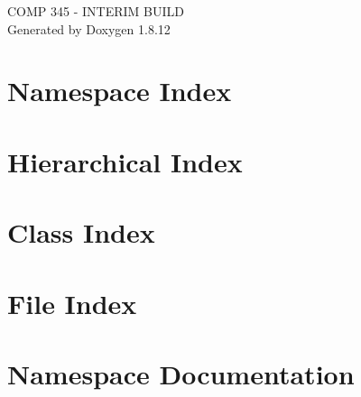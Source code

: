 \documentclass[twoside]{book}
\newcommand{\+}{\discretionary{\mbox{\scriptsize$\hookleftarrow$}}{}{}}
\newcommand{\clearemptydoublepage}{%
  \newpage{\pagestyle{empty}\cleardoublepage}%
}
\begin{document}
\hypersetup{pageanchor=false,
             bookmarksnumbered=true,
             pdfencoding=unicode
            }
\begin{titlepage}
\vspace*{7cm}
\begin{center}%
{\Large C\+O\+MP 345 -\/ I\+N\+T\+E\+R\+IM B\+U\+I\+LD }\\
\vspace*{1cm}
{\large Generated by Doxygen 1.8.12}\\
\end{center}
\end{titlepage}
\clearemptydoublepage
{}
\tableofcontents
\clearemptydoublepage
{}
\hypersetup{pageanchor=true}

\chapter{Namespace Index}

\chapter{Hierarchical Index}

\chapter{Class Index}

\chapter{File Index}

\chapter{Namespace Documentation}







\end{document}
